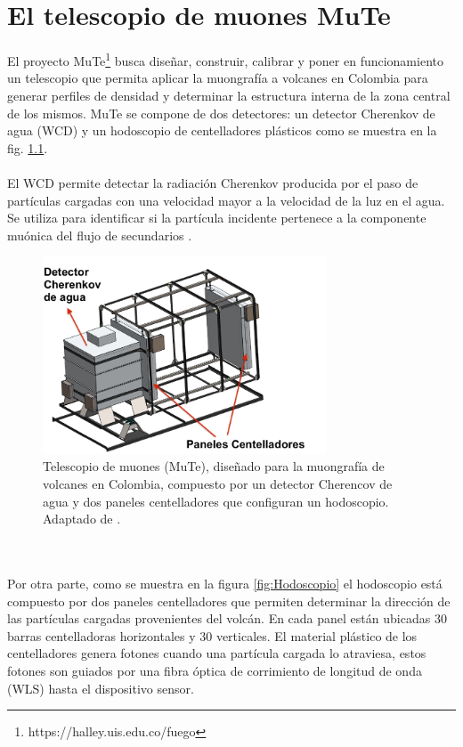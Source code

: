 \chapter{El telescopio de muones MuTe}
\label{Cap:MuTe}
El proyecto MuTe\footnote{https://halley.uis.edu.co/fuego} busca diseñar, construir, calibrar y poner en funcionamiento un telescopio que permita aplicar la muongrafía a volcanes en Colombia para generar perfiles de densidad y determinar la estructura interna de la zona central de los mismos. MuTe se compone de dos detectores: un detector Cherenkov de agua (WCD) y un hodoscopio de centelladores plásticos como se muestra en la fig. \ref{fig:MuTe}.\\ \\
El WCD permite detectar la radiación Cherenkov producida por el paso de partículas cargadas con una velocidad mayor a la velocidad de la luz en el agua. Se utiliza para identificar si la partícula incidente pertenece a la componente muónica del flujo de secundarios \citep{Tesis_adriana}.
\begin{figure}[h!]
\begin{centering}
  \includegraphics[width=0.75\textwidth]{Images/Mute.JPG}
  \caption{Telescopio de muones (MuTe), diseñado para la muongrafía de volcanes en Colombia, compuesto por un detector Cherencov de agua y dos paneles centelladores que configuran un hodoscopio. Adaptado de \citep{MuTe_mec}.}
  \label{fig:MuTe}
  \par\end{centering}
\end{figure}
\\ \\
Por otra parte, como se muestra en la figura \ref{fig:Hodoscopio} el hodoscopio está compuesto por dos paneles centelladores que permiten determinar la dirección de las partículas cargadas provenientes del volcán. En cada panel están ubicadas 30 barras centelladoras horizontales y 30 verticales. El material plástico de los centelladores genera fotones  cuando una partícula cargada lo atraviesa, estos fotones son guiados por una fibra óptica de corrimiento de longitud de onda (WLS) hasta el dispositivo sensor.    
